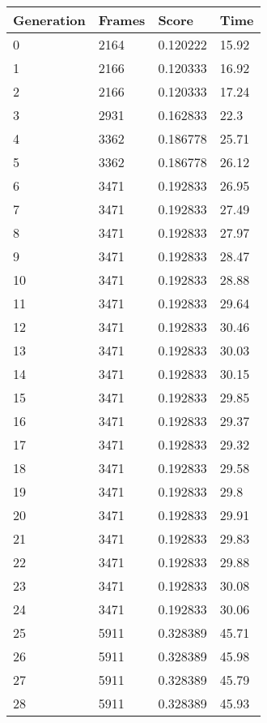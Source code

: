 \begin{table}
\caption{CPU Results}
\centering
 \begin{longtable}{ | l | l | l | l |}
    \hline
    Generation & Frames & Score & Time \\ \hline
    0 & 2164 & 0.120222 & 15.92 \\ \hline
    1 & 2166 & 0.120333 & 16.92 \\ \hline
    2 & 2166 & 0.120333 & 17.24 \\ \hline
    3 & 2931 & 0.162833 & 22.3 \\ \hline
    4 & 3362 & 0.186778 & 25.71 \\ \hline
    5 & 3362 & 0.186778 & 26.12 \\ \hline
    6 & 3471 & 0.192833 & 26.95 \\ \hline
    7 & 3471 & 0.192833 & 27.49 \\ \hline
    8 & 3471 & 0.192833 & 27.97 \\ \hline
    9 & 3471 & 0.192833 & 28.47 \\ \hline
    10 & 3471 & 0.192833 & 28.88 \\ \hline
    11 & 3471 & 0.192833 & 29.64 \\ \hline
    12 & 3471 & 0.192833 & 30.46 \\ \hline
    13 & 3471 & 0.192833 & 30.03 \\ \hline
    14 & 3471 & 0.192833 & 30.15 \\ \hline
    15 & 3471 & 0.192833 & 29.85 \\ \hline
    16 & 3471 & 0.192833 & 29.37 \\ \hline
    17 & 3471 & 0.192833 & 29.32 \\ \hline
    18 & 3471 & 0.192833 & 29.58 \\ \hline
    19 & 3471 & 0.192833 & 29.8 \\ \hline
    20 & 3471 & 0.192833 & 29.91 \\ \hline
    21 & 3471 & 0.192833 & 29.83 \\ \hline
    22 & 3471 & 0.192833 & 29.88 \\ \hline
    23 & 3471 & 0.192833 & 30.08 \\ \hline
    24 & 3471 & 0.192833 & 30.06 \\ \hline
    25 & 5911 & 0.328389 & 45.71 \\ \hline
    26 & 5911 & 0.328389 & 45.98 \\ \hline
    27 & 5911 & 0.328389 & 45.79 \\ \hline
    28 & 5911 & 0.328389 & 45.93 \\ \hline

\end{longtable}
\end{table}
